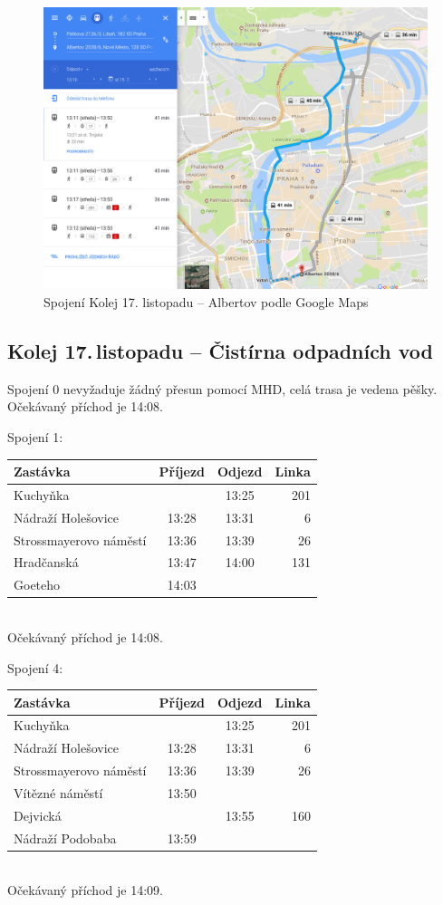 \begin{figure}[h]
  \centering
    \includegraphics[width=\textwidth]{../img/kolej-albertov-google.png}
  \caption{Spojení Kolej 17. listopadu -- Albertov podle Google Maps}
  \label{fig:kolej-albertov-google}
\end{figure}

\clearpage
\subsection{Kolej 17.\,listopadu -- Čistírna odpadních vod}

Spojení 0 nevyžaduje žádný přesun pomocí MHD, celá trasa je vedena pěšky.
Očekávaný příchod je 14:08.

Spojení 1:\\[2mm]
\begin{tabular}{|l|c|c|r|}\hline
{\bf Zastávka}&{\bf Příjezd}&{\bf Odjezd}&{\bf Linka}\\\hline
Kuchyňka&&13:25&201\\\hline
Nádraží Holešovice&13:28&13:31&6\\\hline
Strossmayerovo náměstí&13:36&13:39&26\\\hline
Hradčanská&13:47&14:00&131\\\hline
Goeteho&14:03&&\\\hline
\end{tabular}\\[2mm]
Očekávaný příchod je 14:08.

Spojení 4:\\[2mm]
\begin{tabular}{|l|c|c|r|}\hline
{\bf Zastávka}&{\bf Příjezd}&{\bf Odjezd}&{\bf Linka}\\\hline
Kuchyňka&&13:25&201\\\hline
Nádraží Holešovice&13:28&13:31&6\\\hline
Strossmayerovo náměstí&13:36&13:39&26\\\hline
Vítězné náměstí&13:50&&\\\hline
Dejvická&&13:55&160\\\hline
Nádraží Podobaba&13:59&&\\\hline
\end{tabular}\\[2mm]
Očekávaný příchod je 14:09. 


